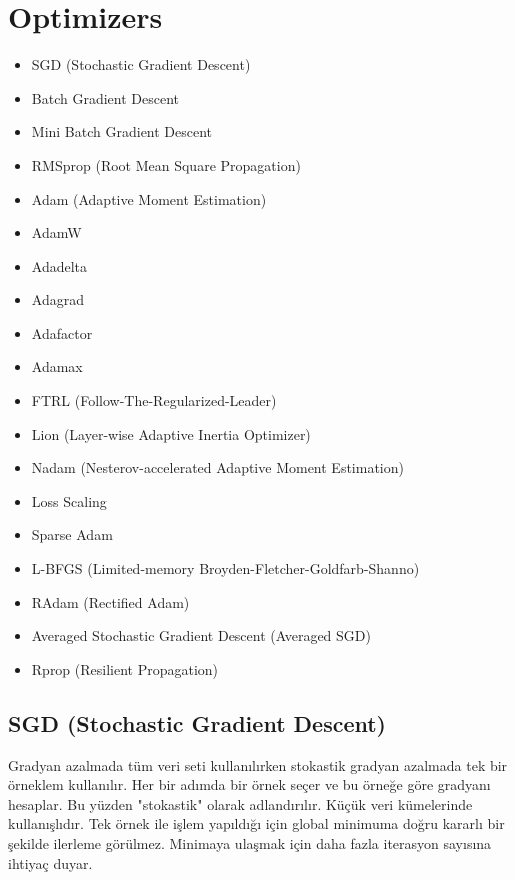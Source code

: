 \section{Optimizers}

\begin{itemize}
	\item SGD (Stochastic Gradient Descent)
	\item Batch Gradient Descent
	\item Mini Batch Gradient Descent
	\item RMSprop (Root Mean Square Propagation)
	\item Adam (Adaptive Moment Estimation)
	\item AdamW
	\item Adadelta
	\item Adagrad
	\item Adafactor
	\item Adamax
	\item FTRL (Follow-The-Regularized-Leader)
	\item Lion (Layer-wise Adaptive Inertia Optimizer)
	\item Nadam (Nesterov-accelerated Adaptive Moment Estimation)
	\item Loss Scaling
	\item Sparse Adam
	\item L-BFGS (Limited-memory Broyden-Fletcher-Goldfarb-Shanno)
	\item RAdam (Rectified Adam)
	\item Averaged Stochastic Gradient Descent (Averaged SGD)
	\item Rprop (Resilient Propagation)
\end{itemize}

\subsection{SGD (Stochastic Gradient Descent)}
Gradyan azalmada tüm veri seti kullanılırken stokastik gradyan azalmada tek bir örneklem kullanılır. Her bir adımda bir örnek seçer ve bu örneğe göre gradyanı hesaplar. Bu yüzden "stokastik" olarak adlandırılır. Küçük veri kümelerinde kullanışlıdır. Tek örnek ile işlem yapıldığı için global minimuma doğru kararlı bir şekilde ilerleme görülmez. Minimaya ulaşmak için daha fazla iterasyon sayısına ihtiyaç duyar.

